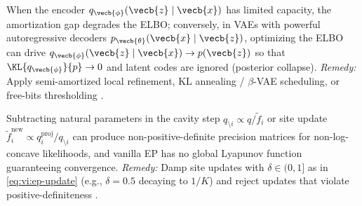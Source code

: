 \documentclass[../../../../master.tex]{subfiles}
\begin{document}
\begin{pitfall}
When the encoder $q_{\vecb{\phi}}(\vecb{z}\mid\vecb{x})$ has limited capacity, the amortization gap degrades the ELBO; conversely, in VAEs with powerful autoregressive decoders $p_{\vecb{\theta}}(\vecb{x}\mid\vecb{z})$, optimizing the ELBO can drive $q_{\vecb{\phi}}(\vecb{z}\mid\vecb{x}) \to p(\vecb{z})$ so that $\KL{q_{\vecb{\phi}}}{p} \to 0$ and latent codes are ignored (posterior collapse). \emph{Remedy:} Apply semi-amortized local refinement, KL annealing / $\beta$-VAE scheduling, or free-bits thresholding .
\end{pitfall}

\begin{pitfall}
Subtracting natural parameters in the cavity step $q_{\setminus i} \propto q / \tilde{f}_i$ or site update $\tilde{f}_i^{\mathrm{new}} \propto q_i^{\mathrm{proj}} / q_{\setminus i}$ can produce non-positive-definite precision matrices for non-log-concave likelihoods, and vanilla EP has no global Lyapunov function guaranteeing convergence. \emph{Remedy:} Damp site updates with $\delta \in (0, 1]$ as in \eqref{eq:vi:ep-update} (e.g., $\delta = 0.5$ decaying to $1/K$) and reject updates that violate positive-definiteness .
\end{pitfall}
\end{document}
